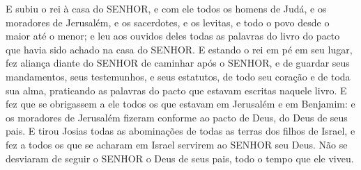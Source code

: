 {  E subiu o rei à casa do SENHOR, e com ele todos os homens de Judá, e os moradores de Jerusalém, e os sacerdotes, e os levitas, e todo o povo desde o maior até o menor; e leu aos ouvidos deles todas as palavras do livro do pacto que havia sido achado na casa do SENHOR.
  E estando o rei em pé em seu lugar, fez aliança diante do SENHOR de caminhar após o SENHOR, e de guardar seus mandamentos, seus testemunhos, e seus estatutos, de todo seu coração e de toda sua alma, praticando as palavras do pacto que estavam escritas naquele livro.
  E fez que se obrigassem a ele todos os que estavam em Jerusalém e em Benjamim: e os moradores de Jerusalém fizeram conforme ao pacto de Deus, do Deus de seus pais.
  E tirou Josias todas as abominações de todas as terras dos filhos de Israel, e fez a todos os que se acharam em Israel servirem ao SENHOR seu Deus. Não se desviaram de seguir o SENHOR o Deus de seus pais, todo o tempo que ele viveu.
\par }

